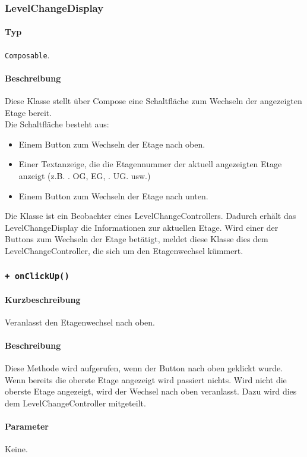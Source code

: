 \subsubsection{LevelChangeDisplay}\label{App_Map_View_LevelChangeDisplay}
\paragraph*{Typ}
\texttt{Composable}.
\paragraph*{Beschreibung}
Diese Klasse stellt über Compose eine Schaltfläche zum Wechseln der angezeigten Etage bereit.\\
Die Schaltfläche besteht aus:
\begin{itemize}
    \item Einem Button zum Wechseln der Etage nach oben.
    \item Einer Textanzeige, die die Etagennummer der aktuell angezeigten Etage anzeigt 
    (z.B. . OG\dq, \dq EG\dq, . UG\dq. usw.)
    \item Einem Button zum Wechseln der Etage nach unten.
\end{itemize}
Die Klasse ist ein Beobachter eines LevelChangeControllers. Dadurch erhält das 
LevelChangeDisplay die Informationen zur aktuellen Etage. Wird einer der Buttons zum 
Wechseln der Etage betätigt, meldet diese Klasse dies dem LevelChangeController, 
die sich um den Etagenwechsel kümmert.

\subsubsection*{\texttt{+ onClickUp()}}%
\paragraph*{Kurzbeschreibung}
Veranlasst den Etagenwechsel nach oben.
\paragraph*{Beschreibung}
Diese Methode wird aufgerufen, wenn der Button nach oben geklickt wurde. \\
Wenn bereits die oberste Etage angezeigt wird passiert nichts. 
Wird nicht die oberste Etage angezeigt, wird der Wechsel nach oben veranlasst.
Dazu wird dies dem LevelChangeController mitgeteilt.
\paragraph*{Parameter}
Keine.
